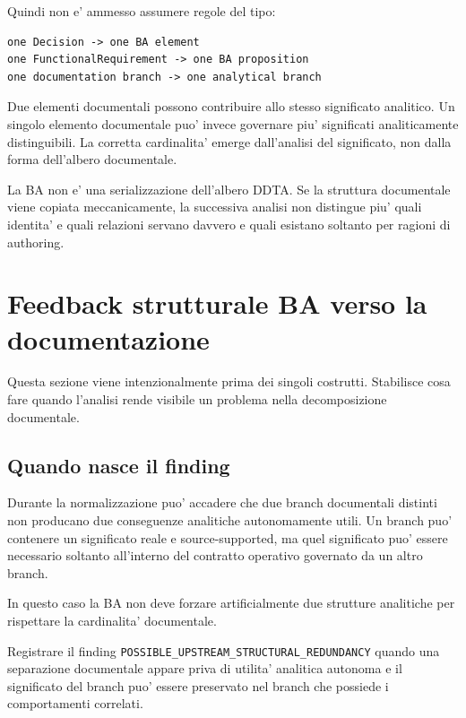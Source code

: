 \documentclass[11pt,a4paper]{article}
\newcommand{\PossibleStructuralRedundancy}{\texttt{POSSIBLE\_UPSTREAM\_STRUCTURAL\_REDUNDANCY}}
\begin{document}
Quindi non e' ammesso assumere regole del tipo:

\begin{lstlisting}
one Decision -> one BA element
one FunctionalRequirement -> one BA proposition
one documentation branch -> one analytical branch
\end{lstlisting}

Due elementi documentali possono contribuire allo stesso significato analitico. Un singolo elemento documentale puo' invece governare piu' significati analiticamente distinguibili. La corretta cardinalita' emerge dall'analisi del significato, non dalla forma dell'albero documentale.

\begin{ddtaanti}[title={Traduzione meccanica}]
La BA non e' una serializzazione dell'albero DDTA. Se la struttura documentale viene copiata meccanicamente, la successiva analisi non distingue piu' quali identita' e quali relazioni servano davvero e quali esistano soltanto per ragioni di authoring.
\end{ddtaanti}

\section{Feedback strutturale BA verso la documentazione}

Questa sezione viene intenzionalmente prima dei singoli costrutti. Stabilisce cosa fare quando l'analisi rende visibile un problema nella decomposizione documentale.

\subsection{Quando nasce il finding}

Durante la normalizzazione puo' accadere che due branch documentali distinti non producano due conseguenze analitiche autonomamente utili. Un branch puo' contenere un significato reale e source-supported, ma quel significato puo' essere necessario soltanto all'interno del contratto operativo governato da un altro branch.

In questo caso la BA non deve forzare artificialmente due strutture analitiche per rispettare la cardinalita' documentale.

\begin{ddtaworking}[title={Diagnostic corrente}]
Registrare il finding \PossibleStructuralRedundancy{} quando una separazione documentale appare priva di utilita' analitica autonoma e il significato del branch puo' essere preservato nel branch che possiede i comportamenti correlati.
\end{ddtaworking}
\end{document}
